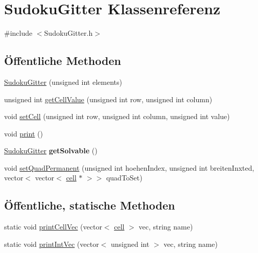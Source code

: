 \hypertarget{class_sudoku_gitter}{\section{Sudoku\-Gitter Klassenreferenz}
\label{class_sudoku_gitter}
}


{\ttfamily \#include $<$Sudoku\-Gitter.\-h$>$}

\subsection*{Öffentliche Methoden}
\begin{DoxyCompactItemize}
\item 
\hyperlink{class_sudoku_gitter_ad3443d5846cba4cef8fdfebc46f16c0b}{Sudoku\-Gitter} (unsigned int elements)
\item 
unsigned int \hyperlink{class_sudoku_gitter_aedc91eeba50722d3b4deb0609a27aedf}{get\-Cell\-Value} (unsigned int row, unsigned int column)
\item 
void \hyperlink{class_sudoku_gitter_aa7fa54638ade311994bd8f6433df8ff0}{set\-Cell} (unsigned int row, unsigned int column, unsigned int value)
\item 
void \hyperlink{class_sudoku_gitter_a771332a8a5eff5e1917538adfb237d0e}{print} ()
\item 
\hypertarget{class_sudoku_gitter_ad089a50f3435a3eb025aacab74b8fbed}{\hyperlink{class_sudoku_gitter}{Sudoku\-Gitter} {\bfseries get\-Solvable} ()}\label{class_sudoku_gitter_ad089a50f3435a3eb025aacab74b8fbed}

\item 
void \hyperlink{class_sudoku_gitter_a2bb7fd934b5b87646bb09b01e80fea8b}{set\-Quad\-Permanent} (unsigned int hoehen\-Index, unsigned int breiten\-Inxted, vector$<$ vector$<$ \hyperlink{structcell}{cell} $\ast$ $>$$>$ quad\-To\-Set)
\end{DoxyCompactItemize}
\subsection*{Öffentliche, statische Methoden}
\begin{DoxyCompactItemize}
\item 
static void \hyperlink{class_sudoku_gitter_a8bbf319c21d2cd6111d36082d3abf78d}{print\-Cell\-Vec} (vector$<$ \hyperlink{structcell}{cell} $>$ vec, string name)
\item 
static void \hyperlink{class_sudoku_gitter_a8496c0d45f5a35e97703787c6756330b}{print\-Int\-Vec} (vector$<$ unsigned int $>$ vec, string name)
\end{DoxyCompactItemize}

